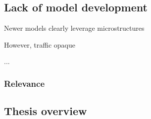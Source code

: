 \subsection{Lack of model development}



Newer models clearly leverage microstructures

However, traffic opaque 

...

\subsubsection{Relevance}

\subsection{Thesis overview}


